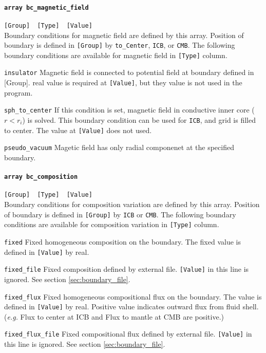 \paragraph{\tt array bc\_magnetic\_field}
\label{href_t:bc_magnetic_field}
\verb|[Group]  [Type]  [Value]| \\
Boundary conditions for magnetic field are defined by this array. Position of boundary is defined in \verb|[Group]| by {\tt to\_Center}, {\tt ICB}, or {\tt CMB}. The following boundary conditions are available for magnetic field in \verb|[Type]| column.
%
\begin{description}
\item{\tt insulator}	Magnetic field is connected to potential field at boundary defined in [Group]. real value is required at \verb|[Value]|, but they value is not used in the program.
\item{\tt sph\_to\_center}	 If this condition is set, magnetic field in conductive inner core ($r < r_{i}$) is solved. This boundary condition can be used for {\tt ICB}, and grid is filled to center. The value at \verb|[Value]| does not used.
\item{\tt pseudo\_vacuum}    Magetic field has only radial componenet at the specified boundary.
\end{description}
%

\paragraph{\tt array bc\_composition}
\label{href_t:bc_composition}
\verb|[Group]  [Type]  [Value]| \\
Boundary conditions for composition variation are defined by this array. Position of boundary is defined in \verb|[Group]| by {\tt ICB} or {\tt CMB}. The following boundary conditions are available for composition variation in \verb|[Type]| column.
%
\begin{description}
\item{\tt fixed}			Fixed homogeneous composition on the boundary. The fixed value is defined in \verb|[Value]| by real.
\item{\tt fixed\_file}			Fixed composition defined by external file. \verb|[Value]| in this line is ignored. See section \ref{sec:boundary_file}.
\item{\tt fixed\_flux}	Fixed homogeneous compositional flux on the boundary. The value is defined in \verb|[Value]| by real. Positive value indicates outward flux from fluid shell. ({\it e.g.} Flux to center at ICB and Flux to mantle at CMB are positive.)
\item{\tt fixed\_flux\_file}			Fixed compositional flux defined by external file. \verb|[Value]| in this line is ignored. See section \ref{sec:boundary_file}.
\end{description}
%

